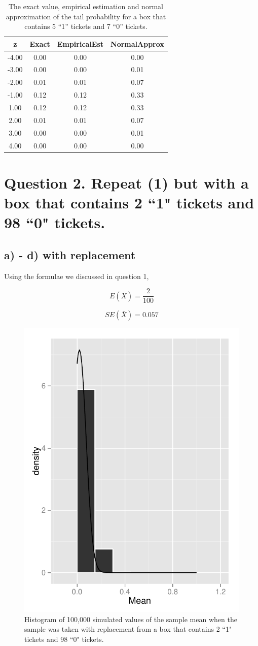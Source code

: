 \documentclass[11pt]{article}
\begin{document}
\begin{table}[H]
\centering
\begin{tabular}{|c|ccc|}
  \hline
z & Exact & EmpiricalEst & NormalApprox \\ 
  \hline
-4.00 & 0.00 & 0.00 & 0.00 \\ 
  -3.00 & 0.00 & 0.00 & 0.01 \\ 
  -2.00 & 0.01 & 0.01 & 0.07 \\ 
  -1.00 & 0.12 & 0.12 & 0.33 \\ 
  1.00 & 0.12 & 0.12 & 0.33 \\ 
  2.00 & 0.01 & 0.01 & 0.07 \\ 
  3.00 & 0.00 & 0.00 & 0.01 \\ 
  4.00 & 0.00 & 0.00 & 0.00 \\ 
   \hline
\end{tabular}
\caption{The exact value, empirical estimation and normal approximation of the tail probability for a box that contains 5 ``1'' tickets and 7 ``0'' tickets.} 
\end{table}






\pagebreak

 \section*{Question 2. Repeat (1) but with a box that contains 2 ``1" tickets and 98 ``0" tickets.}
 
 \subsection*{a) - d) with replacement}
Using the formulae we discussed in question 1,

$$E(\bar{X})= \frac{2}{100}$$ 
 
 $$SE(\bar{X}) = 0.057$$
 


 
\begin{figure}[H]
\centering
\includegraphics[width = .5\textwidth]{histogram_2c-1.pdf}
\caption{Histogram of 100,000 simulated values of the sample mean when the sample was taken with replacement from a box that contains 2 ``1" tickets and 98 ``0" tickets.}\label{q2}
\end{figure}
 
\end{document}
